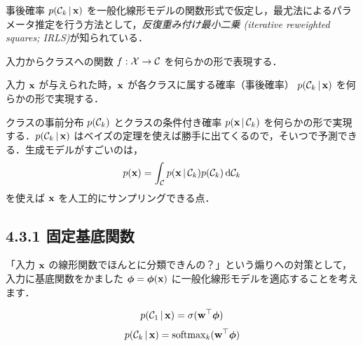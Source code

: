 事後確率 $p({\mathcal{C}}_k \,|\, {\mathbf{x}})$ を一般化線形モデルの関数形式で仮定し，最尤法によるパラメータ推定を行う方法として，\emph{反復重み付け最小二乗 (iterative reweighted squares; IRLS)}が知られている．

\begin{embedbox}
\begin{description}[style=nextline]
  \item[識別モデル] 入力からクラスへの関数 $f: {\mathcal{X}} \to {\mathcal{C}}$ を何らかの形で表現する．
  \item[確率的識別モデル] 入力 ${\mathbf{x}}$ が与えられた時，${\mathbf{x}}$ が各クラスに属する確率（事後確率） $p({\mathcal{C}}_k \,|\, {\mathbf{x}})$ を何らかの形で実現する．
  \item[生成モデル] クラスの事前分布 $p({\mathcal{C}}_k)$ とクラスの条件付き確率 $p({\mathbf{x}} \,|\, {\mathcal{C}}_k)$ を何らかの形で実現する．$p({\mathcal{C}}_k \,|\, {\mathbf{x}})$ はベイズの定理を使えば勝手に出てくるので，そいつで予測できる．生成モデルがすごいのは，
  \[
    p({\mathbf{x}}) = \int_{\mathcal{C}} p({\mathbf{x}} \,|\, {\mathcal{C}}_k) p({\mathcal{C}}_k) \mathop{}\!\mathrm{d}{{\mathcal{C}}_k}
  \]
  を使えば ${\mathbf{x}}$ を人工的にサンプリングできる点．
\end{description}
\end{embedbox}

\subsection*{4.3.1 固定基底関数}

「入力 ${\mathbf{x}}$ の線形関数でほんとに分類できんの？」という煽りへの対策として，入力に基底関数をかました $\boldsymbol{\phi} = \boldsymbol{\phi}({\mathbf{x}})$ に一般化線形モデルを適応することを考えます．

\[
  p({\mathcal{C}}_1 \,|\, {\mathbf{x}}) = \sigma({\mathbf{w}}^\top \boldsymbol{\phi}) 
\]
\[
  p({\mathcal{C}}_k \,|\, {\mathbf{x}}) = \mathrm{softmax}_k({\mathbf{w}}^\top \boldsymbol{\phi})
\]

